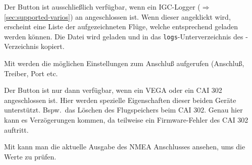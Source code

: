 Der Button  ist ausschließlich verfügbar, wenn ein IGC-Logger ($\Rightarrow$ \ref{sec:supported-varios}) an \xc angeschlossen ist.
Wenn dieser angeklickt wird, erscheint eine Liste der aufgezeichneten Flüge, welche entsprechend geladen werden können.  Die Datei wird geladen und in das \texttt{logs}-Unterverzeichnis des  \xc  - Verzeichnis kopiert.

Mit  werden die möglichen Einstellungen zum  Anschluß aufgerufen (Anschluß, Treiber, Port etc.\

Der Button  ist nur dann verfügbar, wenn ein VEGA oder ein CAI 302 angeschlossen ist. Hier werden spezielle Eigenschaften dieser beiden Geräte unterstützt.  Bspw.\  das Löschen des Flugspeichers beim CAI 302. \warning Genau hier kann es Verzögerungen kommen, da teilweise ein Firmware-Fehler  des CAI 302 auftritt.

Mit  kann man die aktuelle Ausgabe des NMEA Anschlusses ansehen, ums die Werte zu prüfen.
